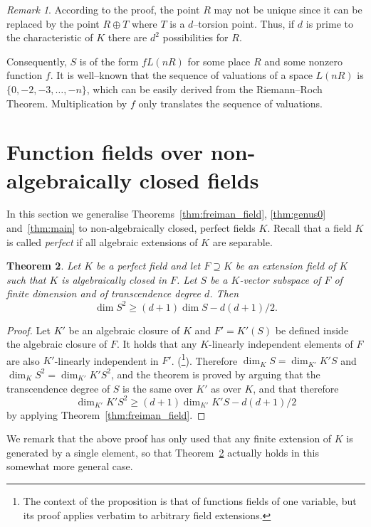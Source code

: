 \documentclass[10pt]{amsart}
\newtheorem{theo}{Theorem}[section]
\theoremstyle{definition}
\theoremstyle{remark}
\newtheorem{rema}[theo]{Remark}
\renewcommand{\geq}{\geqslant}
\begin{document}
\begin{rema}
According to the proof, the point $R$ may not be unique since it can be replaced by the point $R \oplus T$ where $T$ is a $d$--torsion point. Thus, if $d$ is prime to the characteristic of $K$ there are $d^2$ possibilities for $R$.
\end{rema}

Consequently, $S$ is of the form $f L(nR)$ for some place $R$ and some nonzero function $f$. It is well--known that the sequence of valuations of a space $L(nR)$ is $\{0, -2, -3, \ldots, -n\}$, which can be easily derived from the Riemann--Roch Theorem. Multiplication by $f$ only translates the sequence of valuations.


\section{{Function fields over non-algebraically closed fields}}\label{sec:perfect}

In this section we generalise Theorems~\ref{thm:freiman_field}, \ref{thm:genus0} and~\ref{thm:main} to non-algebraically closed, perfect fields $K$. Recall that a field $K$ is called \emph{perfect} if all algebraic extensions of $K$ are separable.

\begin{theo}\label{thm:freiman_perfect}
Let $K$ be a perfect field and let $F \supseteq K$ be an extension field of $K$ such that $K$ is algebraically closed in $F$. Let $S$ be a $K$-vector subspace of $F$ of finite dimension and of transcendence degree $d$. Then
\[
\dim S^2\geq(d+1)\dim S -d(d+1)/2.
\]
\end{theo}

\begin{proof}
Let $K'$ be an algebraic closure of $K$ and $F'=K'(S)$ be defined inside the algebraic closure of $F$. It holds that any $K$-linearly independent elements of $F$ are also $K'$-linearly independent in $F'$. (\cite[Proposition~III.6.1]{Stichtenoth}\footnote{The context of the proposition is that of functions fields of one variable, but its proof applies verbatim to arbitrary field extensions.}). Therefore $\dim_KS=\dim_{K'}K'S$ and $\dim_KS^2=\dim_{K'}K'S^2$, and the theorem is proved by arguing that the transcendence degree of $S$ is the same over $K'$ as over $K$, and that therefore
\[
\dim_{K'}K'S^2\geq(d+1)\dim_{K'}K'S -d(d+1)/2
\]
by applying Theorem~\ref{thm:freiman_field}.
\end{proof}

We remark that the above proof has only used that any finite extension of $K$ is generated by a single element, so that Theorem~\ref{thm:freiman_perfect} actually holds in this somewhat more general case.
\end{document}
